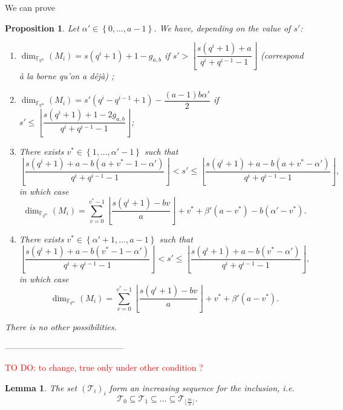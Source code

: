 \documentclass[a4paper]{article}
\newtheorem{proposition}[thm]{Proposition}
\newtheorem{lemma}[thm]{Lemma}
\theoremstyle{definition}
\theoremstyle{remark}
\newcommand{\calT}{\mathcal{T}}
\newcommand{\fqm}{\mathbb{F}_{q^m}}
\newcommand{\set}[1]{\left\{#1\right\}}
\newcommand\TODO[1]{\textcolor{red}{TO DO: #1}}
\begin{document}
We can prove

\begin{proposition}
    Let $\alpha' \in \set{0,\dots,a-1}$. We have, depending on the value of $s'$:
    \begin{enumerate}
        \item $\dim_{\fqm}(M_i) = s(q^i+1)+1-g_{a,b}$ if $s' > \left\lfloor \dfrac{s(q^i+1)+a}{q^i+q^{i-1}-1}\right\rfloor$ \color{red} (correspond à la borne qu'on a déjà) \color{black};
        \item $\dim_{\fqm}(M_i) = s'(q^i-q^{i-1}+1) - \dfrac{(a-1)b\alpha'}{2}$ if $s' \leq \left\lfloor \dfrac{s(q^i+1)+1-2g_{a,b}}{q^i+q^{i-1}-1}\right\rfloor$;
        \item There exists $v^* \in \set{1,\dots,\alpha'-1}$ such that
        $$ \left\lfloor \dfrac{s(q^i+1)+a-b(a+v^*-1-\alpha')}{q^i+q^{i-1}-1}\right\rfloor < s' \leq  \left\lfloor \dfrac{s(q^i+1)+a-b(a+v^*-\alpha')}{q^i+q^{i-1}-1}\right\rfloor,$$
        in which case 
        $$\dim_{\fqm}(M_i) = \sum\limits_{v=0}^{v^*-1} \left\lfloor \dfrac{s(q^i+1)-bv}{a} \right\rfloor + v^* + \beta'(a-v^*)-b(\alpha'-v^*).$$
        \item There exists $v^* \in \set{\alpha'+1,\dots,a-1}$ such that
        $$ \left\lfloor \dfrac{s(q^i+1)+a-b(v^*-1-\alpha')}{q^i+q^{i-1}-1}\right\rfloor < s' \leq  \left\lfloor \dfrac{s(q^i+1)+a-b(v^*-\alpha')}{q^i+q^{i-1}-1}\right\rfloor,$$
        in which case 
        $$\dim_{\fqm}(M_i) = \sum\limits_{v=0}^{v^*-1} \left\lfloor \dfrac{s(q^i+1)-bv}{a} \right\rfloor + v^* + \beta'(a-v^*).$$
    \end{enumerate}
    There is no other possibilities.
\end{proposition}

\begin{center}\color{red} ------------------------------------------\color{black}\end{center}



\TODO{to change, true only under other condition ?}

\color{blue}

\begin{lemma} \label{lem:inclusion_T_i's}
    The set $(\calT_i)_i$ form an increasing sequence for the inclusion, \emph{i.e.}
    $$\calT_0 \subseteq \calT_1 \subseteq \dots \subseteq \calT_{\lfloor \frac{m}{2}\rfloor}.$$
\end{lemma}
\end{document}
